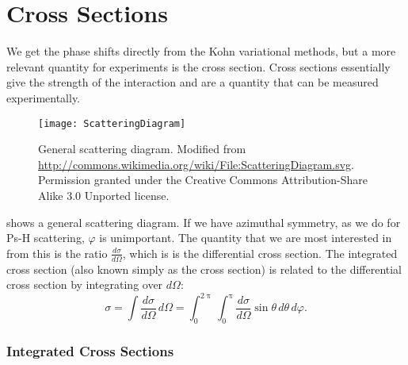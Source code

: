 \documentclass[Dissertation.tex]{subfiles}
\begin{document}
\clearpage
\pagebreak
\newpage

\chapter{Cross Sections}
\label{chp:CrossSections}


We get the phase shifts directly from the Kohn variational methods, but a more relevant quantity for experiments is the cross section. Cross sections essentially give the strength of the interaction and are a quantity that can be measured experimentally.

\begin{figure}[H]
	\centering
	\texttt{[image: ScatteringDiagram]}
	\caption[General scattering diagram]{General scattering diagram. Modified from \url{http://commons.wikimedia.org/wiki/File:ScatteringDiagram.svg}. Permission granted under the Creative Commons Attribution-Share Alike 3.0 Unported license.}
	\label{fig:ScatteringDiagram}
\end{figure}

 shows a general scattering diagram. If we have
azimuthal symmetry, as we do for Ps-H scattering, $\varphi$ is unimportant.
The quantity that we are most interested in from this is the ratio
$\frac{d\sigma}{d\Omega}$, which is is the differential cross section.
The integrated cross section (also known simply as the cross section) is
related to the differential cross section by integrating over $d\Omega$:
\begin{equation}
\label{eq:TotalDiffCross}
\sigma = \int \frac{d\sigma}{d\Omega} \, d\Omega
 = \int_0^{2\uppi} \int_0^{\uppi} \frac{d\sigma}{d\Omega} \sin\theta \, d\theta \, d\varphi.
\end{equation}


\subsection{Integrated Cross Sections}
\label{sec:totalcross}
\end{document}
